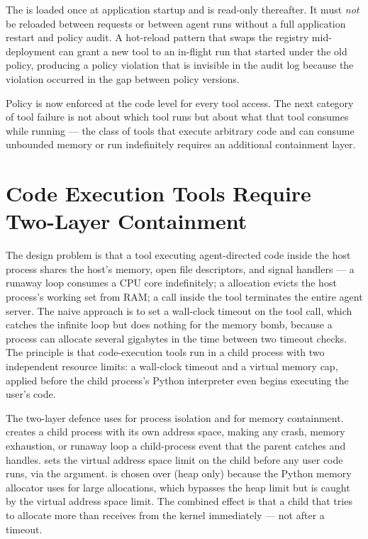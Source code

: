 \begin{notebox}
The  is loaded once at application startup and is
read-only thereafter. It must \emph{not} be reloaded between requests or
between agent runs without a full application restart and policy audit. A
hot-reload pattern that swaps the registry mid-deployment can grant a new
tool to an in-flight run that started under the old policy, producing a
policy violation that is invisible in the audit log because the violation
occurred in the gap between policy versions.
\end{notebox}

Policy is now enforced at the code level for every tool access. The next
category of tool failure is not about which tool runs but about what that
tool consumes while running --- the class of tools that execute arbitrary
code and can consume unbounded memory or run indefinitely requires an
additional containment layer.


\section{Code Execution Tools Require Two-Layer Containment}
\label{sec:tool-sandbox}

The design problem is that a tool executing agent-directed code inside the
host process shares the host's memory, open file descriptors, and signal
handlers --- a runaway  loop consumes a CPU core
indefinitely; a  allocation evicts the host
process's working set from RAM; a  call inside the tool
terminates the entire agent server. The naive approach is to set a
wall-clock timeout on the tool call, which catches the infinite loop but
does nothing for the memory bomb, because a process can allocate several
gigabytes in the time between two timeout checks. The principle is that
code-execution tools run in a child process with two independent resource
limits: a wall-clock timeout and a virtual memory cap, applied before the
child process's Python interpreter even begins executing the user's code.

The two-layer defence uses  for process isolation
and  for memory containment. 
creates a child process with its own address space, making any crash,
memory exhaustion, or runaway loop a child-process event that the parent
catches and handles.  sets the virtual address space limit on the child before any user
code runs, via the  argument.  is chosen
over  (heap only) because the Python memory allocator
uses  for large allocations, which bypasses the heap limit but
is caught by the virtual address space limit. The combined effect is that
a child that tries to allocate more than  receives
 from the kernel immediately --- not after a timeout.

